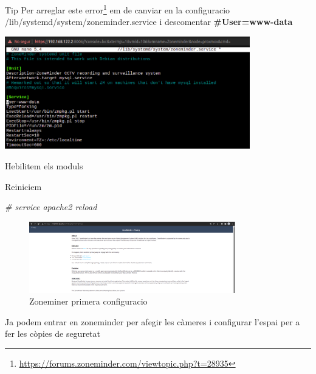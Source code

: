 \documentclass[
  10pt,
]{krantz}
\newenvironment{Shaded}{\begin{snugshade}}{\end{snugshade}}
\newcommand{\CommentTok}[1]{\textcolor[rgb]{0.56,0.35,0.01}{\textit{#1}}}
\newcommand{\ExtensionTok}[1]{#1}
\newcommand{\NormalTok}[1]{#1}
\DeclareRobustCommand{\href}[2]{#2\footnote{\url{#1}}}
\begin{document}
\begin{rmdtip}{Tip}
Per arreglar este \href{https://forums.zoneminder.com/viewtopic.php?t=28935}{error} em de canviar en la configuracio /lib/systemd/system/zoneminder.service i descomentar \textbf{\#User=www-data}

\includegraphics[width=0.8\textwidth,height=\textheight]{imatges/proxmox/error_zone.png}

\end{rmdtip}

Hebilitem els moduls

\begin{Shaded}
\end{Shaded}

Reiniciem

\begin{Shaded}
\begin{Highlighting}[]
\CommentTok{\# service apache2 reload}
\end{Highlighting}
\end{Shaded}

\begin{figure}
\centering
\includegraphics[width=0.8\textwidth,height=\textheight]{imatges/proxmox/Zoneminer_GUI_inicial.png}
\caption{Zoneminer primera configuracio}
\end{figure}

Ja podem entrar en zoneminder per afegir les càmeres i configurar l'espai per a fer les còpies de seguretat
\end{document}
